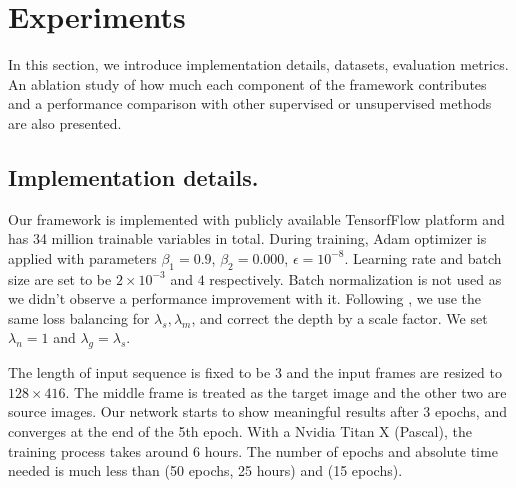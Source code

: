 \vspace{-0.7\baselineskip}
\section{Experiments}
\label{sec:experiments}
\vspace{-0.3\baselineskip}

In this section, we introduce implementation details, datasets, evaluation metrics. An ablation study of how much each component of the framework contributes and a performance comparison with other supervised or unsupervised methods are also presented.

\vspace{-0.3\baselineskip}
\subsection{Implementation details.}
\vspace{-0.1\baselineskip}
Our framework is implemented with publicly available TensorfFlow \cite{abadi2016tensorflow} platform and has 34 million trainable variables in total. During training, Adam optimizer is applied with parameters $\beta_1 = 0.9$, $\beta_2=0.000$, $\epsilon=10^{-8}$. Learning rate and batch size are set to be $2\times10^{-3}$ and $4$ respectively. Batch normalization \cite{ioffe2015batch} is not used as we didn't observe a performance improvement with it. Following \cite{zhou2017unsupervised}, we use the same loss balancing for $\lambda_s, \lambda_m$, and correct the depth by a scale factor. We set $\lambda_n=1$ and $\lambda_g=\lambda_s$. %

The length of input sequence is fixed to be 3 and the input frames are resized to $128 \times 416$. The middle frame is treated as the target image and the other two are source images. Our network starts to show meaningful results after 3 epochs, and converges at the end of the 5th epoch. With a Nvidia Titan X (Pascal), the training process takes around 6 hours. The number of epochs and absolute time needed is much less than \cite{godard2016unsupervised} (50 epochs, 25 hours) and \cite{zhou2017unsupervised} (15 epochs).


